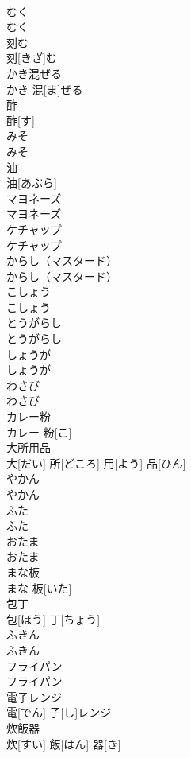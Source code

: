 \documentclass[8pt]{extreport}
\begin{document}
\begin{CJK}{UTF8}{min}
\\	むく	
\\	むく		
\\	刻む	
\\	刻[きざ]む		
\\	かき混ぜる	
\\	かき 混[ま]ぜる		
\\	酢	
\\	酢[す]		
\\	みそ	
\\	みそ		
\\	油	
\\	油[あぶら]		
\\	マヨネーズ	
\\	マヨネーズ		
\\	ケチャップ	
\\	ケチャップ		
\\	からし（マスタード）	
\\	からし（マスタード）		
\\	こしょう	
\\	こしょう		
\\	とうがらし	
\\	とうがらし		
\\	しょうが	
\\	しょうが		
\\	わさび	
\\	わさび		
\\	カレー粉	
\\	カレー 粉[こ]		
\\	大所用品	
\\	大[だい] 所[どころ] 用[よう] 品[ひん]		
\\	やかん	
\\	やかん		
\\	ふた	
\\	ふた		
\\	おたま	
\\	おたま		
\\	まな板	
\\	まな 板[いた]		
\\	包丁	
\\	包[ほう] 丁[ちょう]		
\\	ふきん	
\\	ふきん		
\\	フライパン	
\\	フライパン		
\\	電子レンジ	
\\	電[でん] 子[し]レンジ		
\\	炊飯器	
\\	炊[すい] 飯[はん] 器[き]		

\end{CJK}
\end{document}
